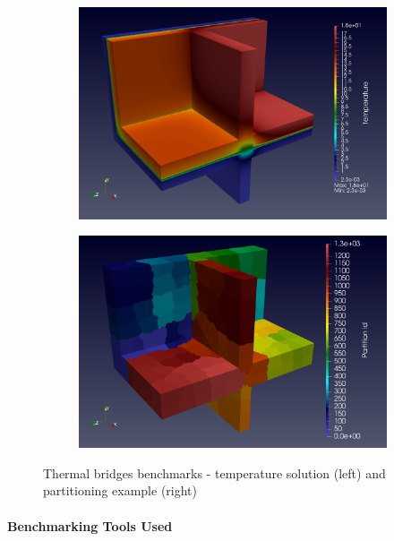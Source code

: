 \begin{figure}[h]
  \centering
  \begin{subfigure}[c]{0.49\textwidth}
    \centering
    \includegraphics[width=\textwidth]{graphics/feelpp/feelpp-benchmark-thermalbridges-solution.png}
  \end{subfigure}
  \hfill
  \begin{subfigure}[c]{0.49\textwidth}
    \centering
    \includegraphics[width=\textwidth]{graphics/feelpp/feelpp-benchmark-thermalbridges-pid.png}
  \end{subfigure}
  \caption{Thermal bridges benchmarks - temperature solution (left) and
    partitioning example (right)}
  \label{fig:wp1:feelpp:thermal_bridges:visualization}
\end{figure}



\paragraph{Benchmarking Tools Used}

